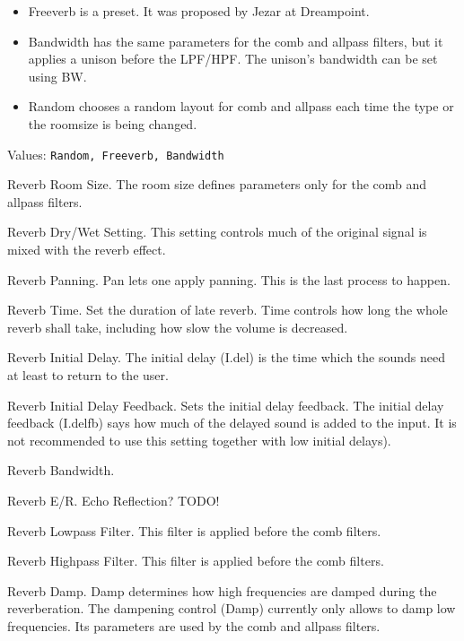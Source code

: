   \begin{itemize}
      \item Freeverb is a preset. It was proposed by Jezar at Dreampoint.
      \item Bandwidth has the same parameters for the comb and allpass
         filters, but it applies a unison before the LPF/HPF. The unison’s
         bandwidth can be set using BW.
      \item Random chooses a random layout for comb and allpass each time the
         type or the roomsize is being changed.
   \end{itemize}

   Values: \texttt{Random, Freeverb, Bandwidth}

   Reverb Room Size.
   The room size defines parameters only for the comb and allpass filters.

   Reverb Dry/Wet Setting.
   This setting controls much of the original signal is mixed with the
   reverb effect.

   Reverb Panning.
   Pan lets one apply panning. This is the last process to happen.

   Reverb Time.
   Set the duration of late reverb.
   Time controls how long the whole reverb shall take, including how slow
   the volume is decreased.

   Reverb Initial Delay.
   The initial delay (I.del) is the time which the sounds need at least to
   return to the user.

   Reverb Initial Delay Feedback.
   Sets the initial delay feedback.
   The initial delay feedback (I.delfb) says how much
   of the delayed sound is added to the input.
   It is not recommended to use this setting together with
   low initial delays).

   Reverb Bandwidth.

   Reverb E/R.
   Echo Reflection?  TODO!

   Reverb Lowpass Filter.
   This filter is applied before the comb filters.

   Reverb Highpass Filter.
   This filter is applied before the comb filters.

   Reverb Damp.
   Damp determines how high frequencies are damped during the
   reverberation.  The dampening control (Damp) currently only allows to
   damp low frequencies. Its parameters are used by the comb and allpass
   filters.

